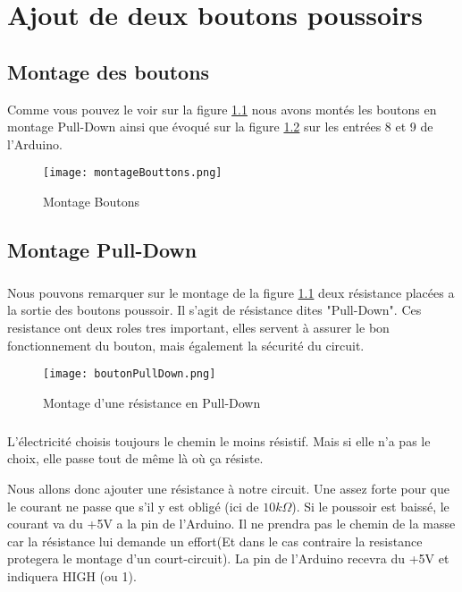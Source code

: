 \chapter{Ajout de deux boutons poussoirs}

\section{Montage des boutons}
Comme vous pouvez le voir sur la figure \ref{montageBoutons} nous avons montés les boutons en montage Pull-Down ainsi que évoqué sur la figure \ref{montagePullDown} sur les entrées 8 et 9 de l'Arduino.
\begin{figure}[h]
	\centering
	\texttt{[image: montageBouttons.png]}
    \caption{Montage Boutons}
    \label{montageBoutons}    
\end{figure}

\newpage
\section{Montage Pull-Down}
\paragraph{}
	Nous pouvons remarquer sur le montage de la figure \ref{montageBoutons} deux résistance placées a la sortie des boutons poussoir. Il s'agit de résistance dites "Pull-Down". Ces resistance ont deux roles tres important, elles servent à assurer le bon fonctionnement du bouton, mais également la sécurité du circuit.
    
\begin{figure}[h]
	\centering
	\texttt{[image: boutonPullDown.png]}
    \caption{Montage d'une résistance en Pull-Down}
    \label{montagePullDown}
\end{figure}

\paragraph{}
	L'électricité choisis toujours le chemin le moins résistif. Mais si elle n'a pas le choix, elle passe tout de même là où ça résiste.

	Nous allons donc ajouter une résistance à notre circuit. Une assez forte pour que le courant ne passe que s'il y est obligé (ici de $10k\Omega$).
	Si le poussoir est baissé, le courant va du +5V a la pin de l'Arduino. Il ne prendra pas le chemin de la masse car la résistance lui demande un effort(Et dans le cas contraire la resistance protegera le montage d'un court-circuit). La pin de l'Arduino recevra du +5V et indiquera HIGH (ou 1).

